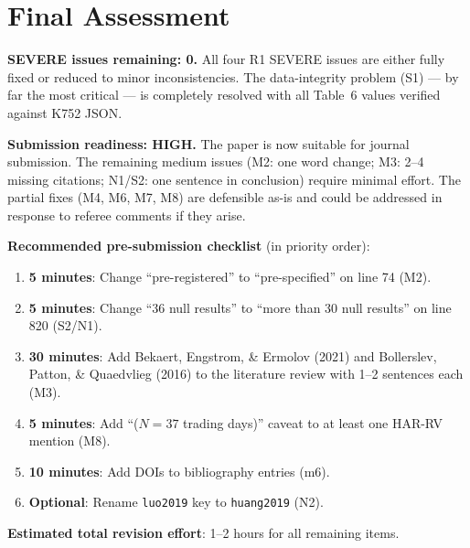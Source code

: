 \documentclass[12pt,a4paper]{article}
\begin{document}
\section*{Final Assessment}

\textbf{SEVERE issues remaining: 0.} All four R1 SEVERE issues are either fully fixed or reduced to minor inconsistencies. The data-integrity problem (S1) --- by far the most critical --- is completely resolved with all Table~6 values verified against K752 JSON.

\textbf{Submission readiness: HIGH.} The paper is now suitable for journal submission. The remaining medium issues (M2: one word change; M3: 2--4 missing citations; N1/S2: one sentence in conclusion) require minimal effort. The partial fixes (M4, M6, M7, M8) are defensible as-is and could be addressed in response to referee comments if they arise.

\textbf{Recommended pre-submission checklist} (in priority order):
\begin{enumerate}
    \item \textbf{5 minutes}: Change ``pre-registered'' to ``pre-specified'' on line 74 (M2).
    \item \textbf{5 minutes}: Change ``36 null results'' to ``more than 30 null results'' on line 820 (S2/N1).
    \item \textbf{30 minutes}: Add Bekaert, Engstrom, \& Ermolov (2021) and Bollerslev, Patton, \& Quaedvlieg (2016) to the literature review with 1--2 sentences each (M3).
    \item \textbf{5 minutes}: Add ``($N = 37$ trading days)'' caveat to at least one HAR-RV mention (M8).
    \item \textbf{10 minutes}: Add DOIs to bibliography entries (m6).
    \item \textbf{Optional}: Rename \texttt{luo2019} key to \texttt{huang2019} (N2).
\end{enumerate}

\bigskip
\noindent
\textbf{Estimated total revision effort}: 1--2 hours for all remaining items.
\end{document}
